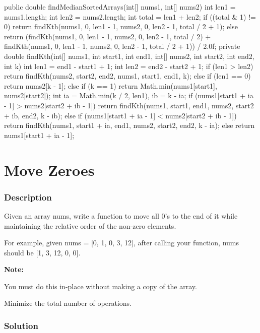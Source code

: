 \begin{Code}
public double findMedianSortedArrays(int[] nums1, int[] nums2) {
    int len1 = nums1.length;
    int len2 = nums2.length;
    int total = len1 + len2;
    if ((total & 1) != 0) {
        return findKth(nums1, 0, len1 - 1, nums2, 0, len2 - 1, total / 2 + 1);
    } else {
        return (findKth(nums1, 0, len1 - 1, nums2, 0, len2 - 1, total / 2) + findKth(nums1, 0, len1 - 1, nums2, 0, len2 - 1, total / 2 + 1)) / 2.0f;
    }
}
private double findKth(int[] nums1, int start1, int end1, int[] nums2, int start2, int end2, int k) {
    int len1 = end1 - start1 + 1;
    int len2 = end2 - start2 + 1;
    if (len1 > len2) {
        return findKth(nums2, start2, end2, nums1, start1, end1, k);
    } else if (len1 == 0) {
        return nums2[k - 1];
    } else if (k == 1) {
        return Math.min(nums1[start1], nums2[start2]);
    }
    int ia = Math.min(k / 2, len1), ib = k - ia;
    if (nums1[start1 + ia - 1] > nums2[start2 + ib - 1]) {
        return findKth(nums1, start1, end1, nums2, start2 + ib, end2, k - ib);
    } else if (nums1[start1 + ia - 1] < nums2[start2 + ib - 1]) {
        return findKth(nums1, start1 + ia, end1, nums2, start2, end2, k - ia);
    } else {
        return nums1[start1 + ia - 1];
    }
}
\end{Code}

\newpage

\section{Move Zeroes} %

\subsubsection{Description}
Given an array nums, write a function to move all 0's to the end of it while maintaining the relative order of the non-zero elements.

For example, given nums = [0, 1, 0, 3, 12], after calling your function, nums should be [1, 3, 12, 0, 0].

\textbf{Note:}

You must do this in-place without making a copy of the array.

Minimize the total number of operations.

\subsubsection{Solution}

